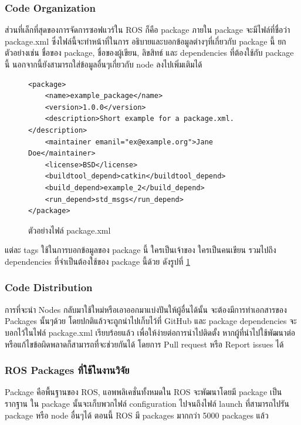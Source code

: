 \subsubsection*{Code Organization}
ส่วนที่เล็กที่สุดของการจัดการซอฟแวร์ใน ROS ก็คือ package ภายใน package จะมีไฟล์ที่ชื่อว่า package.xml
ซึ่งไฟล์นี้จะทำหน้าที่ในการ อธิบายและบอกข้อมูลต่างๆที่เกี่ยวกับ package นี้ ยกตัวอย่างเช่น
ชื่อของ package, ชื่อของผู้เขียน, ลิขสิทธ์ และ dependencies ที่ต้องใช้กับ package นี้
นอกจากนี้ยังสามารถใส่ข้อมูลอื่นๆเกี่ยวกับ node ลงไปเพิ่มเติมได้

\begin{figure}[!ht]
	\begin{Verbatim}[fontsize=\small]
<package>
	<name>example_package</name>
	<version>1.0.0</version>
	<description>Short example for a package.xml.</description>
	<maintainer emanil="ex@example.org">Jane Doe</maintainer>
	<license>BSD</license>
	<buildtool_depend>catkin</buildtool_depend>
	<build_depend>example_2</build_depend>
	<run_depend>std_msgs</run_depend>
</package>
	\end{Verbatim}
	\caption{ตัวอย่างไฟล์ package.xml}
    \label{fig:example_packagexml}
\end{figure}

แต่ละ tags ใช้ในการบอกข้อมูลของ package นี้ ใครเป็นเจ้าของ ใครเป็นคนเขียน รวมไปถึง dependencies
ที่จำเป็นต้องใช้ของ package นี้ด้วย ดังรูปที่ \ref{fig:example_packagexml} 

\clearpage
\subsubsection*{Code Distribution}
การที่จะนำ Nodes กลับมาใช้ใหม่หรือเอาออกมาแบ่งปันให้ผู้อื่นได้นั้น จะต้องมีการทำเอกสารของ Packages นั้นๆด้วย
โดยปกติแล้วจะถูกนำไปเก็บไว้ที่ GitHub และ package dependencies จะบอกไว้ในไฟล์ package.xml
เรียบร้อยแล้ว เพื่อให้ง่ายต่อการนำไปติดตั้ง หากผู้ที่นำไปใช้พัฒนาต่อหรือแก้ไขข้อผิดพลาดก็สามารถที่จะช่วยกันได้
โดยการ Pull request หรือ Report issues ได้

\subsubsection*{ROS Packages ที่ใช้ในงานวิจัย}
Package คือพื้นฐานของ ROS, แอพพลิเคชั่นทั้งหมดใน ROS จะพัฒนาโดยมี package เป็นรากฐาน ใน package นั้นจะเก็บพวกไฟล์
configuration ไปจนถึงไฟล์ launch ที่สามารถไปรัน package หรือ node อื่นๆได้ ตอนนี้ ROS มี packages มากกว่า 5000 packages แล้ว


